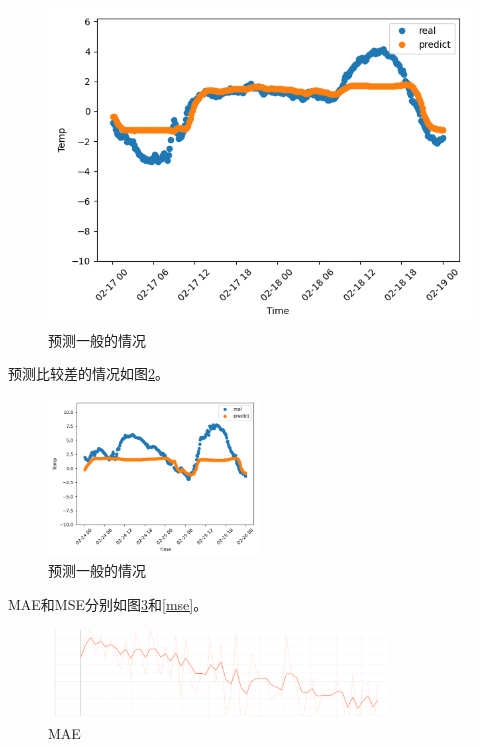 \documentclass{article}
\begin{document}
\begin{figure}[H]
\begin{minipage}[H]{0.3\linewidth}
        \includegraphics[width=\textwidth]{figures/weather_mid3.png}
    \end{minipage}
    \caption{预测一般的情况}
    \label{weather-mid1}
\end{figure}

预测比较差的情况如图\ref{weather-bad1}。

\begin{figure}[H]
    \centering
    \includegraphics[width=0.5\textwidth]{figures/weather_bad1.png}
    \caption{预测一般的情况}
    \label{weather-bad1}
\end{figure}

MAE和MSE分别如图\ref{mae}和\ref{mse}。

\begin{figure}[H]
    \centering
    \includegraphics[width=0.8\textwidth]{figures/mae.png}
    \caption{MAE}
    \label{mae}
\end{figure}
\end{document}
